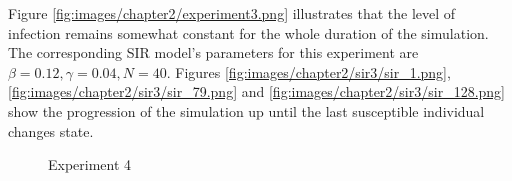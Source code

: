 
Figure \ref{fig:images/chapter2/experiment3.png} illustrates that the level of infection remains somewhat constant for the whole duration of the simulation.
The corresponding SIR model's parameters for this experiment are $\beta = 0.12, \gamma = 0.04, N = 40$.
Figures \ref{fig:images/chapter2/sir3/sir_1.png}, \ref{fig:images/chapter2/sir3/sir_79.png} and \ref{fig:images/chapter2/sir3/sir_128.png} show the progression of the simulation up until the last susceptible individual changes state.

\begin{figure}[H]
    \centering
    \hspace*{\fill}
    \hspace*{\fill}

    \caption{Experiment 4} \label{fig:experiment3}
\end{figure}

